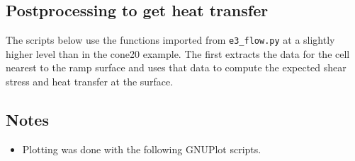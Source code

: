 \bigskip
\subsection{Postprocessing to get heat transfer}
\label{convex-ramp-post-processing}
%
The scripts below use the functions imported from \verb!e3_flow.py!
at a slightly higher level than in the cone20 example.
The first extracts the data for the cell nearest to the ramp surface
and uses that data to compute the expected shear stress and heat transfer at the surface.

\noindent
\topbar

\bottombar

\subsection{Notes}
\begin{itemize}
 \item Plotting was done with the following GNUPlot scripts.
 
 
\end{itemize}
